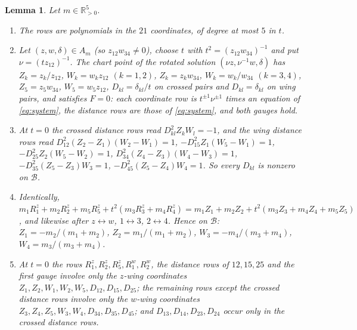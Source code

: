 \documentclass[Threeside,11pt]{article}
\newtheorem{lemma}[theorem]{Lemma}
\theoremstyle{definition}
\theoremstyle{remark}
\numberwithin{equation}{section}
\theoremstyle{remark}
\newcommand{\Rp}{\mathbb{R}_{>0}}
\newenvironment{romanlist}{\begin{enumerate}\renewcommand{\labelenumi}{(\roman{enumi})}%
  \renewcommand{\theenumi}{\roman{enumi}}}{\end{enumerate}}
\begin{document}
{\begin{lemma}\label{d6-lem-chart}
Let $m\in\Rp^5$.
\begin{romanlist}
  \item The rows are polynomials in the $21$ coordinates, of degree at most $5$ in $t$.
  \item Let $(z,w,\delta)\in A_m$ (so $z_{12}w_{34}\ne0$), choose $t$ with
  $t^2=(z_{12}w_{34})^{-1}$ and put $\nu=(tz_{12})^{-1}$.  The chart point of the rotated
  solution $(\nu z,\nu^{-1}w,\delta)$ has $Z_k=z_k/z_{12}$, $W_k=w_kz_{12}$ $(k=1,2)$,
  $Z_k=z_kw_{34}$, $W_k=w_k/w_{34}$ $(k=3,4)$, $Z_5=z_5w_{34}$, $W_5=w_5z_{12}$,
  $D_{kl}=\delta_{kl}/t$ on crossed pairs and $D_{kl}=\delta_{kl}$ on wing pairs, and satisfies
  $F=0$: each coordinate row is $t^{\pm1}\nu^{\pm1}$ times an equation of \eqref{eq:system}, the
  distance rows are those of \eqref{eq:system}, and both gauges hold.
  \item At $t=0$ the crossed distance rows read $D_{kl}^2Z_kW_l=-1$, and the wing distance rows
  read $D_{12}^2(Z_2-Z_1)(W_2-W_1)=1$, $-D_{15}^2Z_1(W_5-W_1)=1$, $-D_{25}^2Z_2(W_5-W_2)=1$,
  $D_{34}^2(Z_4-Z_3)(W_4-W_3)=1$, $-D_{35}^2(Z_5-Z_3)W_3=1$, $-D_{45}^2(Z_5-Z_4)W_4=1$.  So
  every $D_{kl}$ is nonzero on $\mathcal B$.
  \item Identically,
  $m_1R^z_1+m_2R^z_2+m_5R^z_5+t^2(m_3R^z_3+m_4R^z_4)=m_1Z_1+m_2Z_2+t^2(m_3Z_3+m_4Z_4+m_5Z_5)$,
  and likewise after $z\leftrightarrow w$, $1\leftrightarrow3$, $2\leftrightarrow4$.  Hence on
  $\mathcal B$: $Z_1=-m_2/(m_1+m_2)$, $Z_2=m_1/(m_1+m_2)$, $W_3=-m_4/(m_3+m_4)$,
  $W_4=m_3/(m_3+m_4)$.
  \item At $t=0$ the rows $R^z_1,R^z_2,R^z_5,R^w_1,R^w_2$, the distance rows of $12,15,25$ and
  the first gauge involve only the \emph{$z$-wing coordinates}
  $Z_1,Z_2,W_1,W_2,W_5,D_{12},D_{15},D_{25}$; the remaining rows except the crossed distance rows
  involve only the \emph{$w$-wing coordinates} $Z_3,Z_4,Z_5,W_3,W_4,D_{34},D_{35},D_{45}$; and
  $D_{13},D_{14},D_{23},D_{24}$ occur only in the crossed distance rows.
\end{romanlist}
\end{lemma}}
\end{document}

